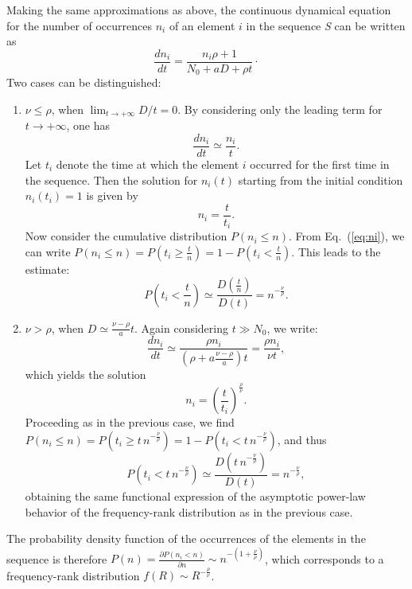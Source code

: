 \documentclass[graybox]{svmult}
\begin{document}
Making the same approximations as above, the continuous dynamical equation for the number of occurrences $n_i$ of an element $i$ in the sequence {\em S} can be written as
%
\begin{equation}
	\frac{d n_i}{d t} = \frac{n_i \rho  +1}{N_0+aD+\rho t}\cdot
\label{eq:dni_dt}
\end{equation}
%
Two cases can be distinguished: 
%
\begin{enumerate}
%
\item $\nu\leq \rho$, when  
\( \displaystyle \lim_{t  \rightarrow +\infty} D/t =  0\). 
By considering only the leading term for \mbox{$t \rightarrow +\infty$}, one has
%
\begin{equation}
	\frac{d n_i}{d t} \simeq \frac{n_i}{t}.
\end{equation}
%
Let $t_i$ denote the time at which the element $i$ occurred for the first time in the sequence. Then the solution for $n_i(t)$ starting from the initial condition  $n_i(t_i)=1$ is given by
%
\begin{equation}
	n_i =\frac{t}{t_i}. \label{eq:ni}
\end{equation}
%
Now consider the cumulative distribution $P(n_i\leq n)$. From Eq.~(\ref{eq:ni}), we can write $P(n_i\leq n)=P(t_i \geq \frac{t}{n})= 1 -P(t_i <\frac{t}{n})$. This leads to the estimate: 
%
\begin{equation}
P(t_i<\frac{t}{n})\simeq\frac{D(\frac{t}{n})}{D(t)}= n^{-\frac{\nu}{\rho}}. \label{eq:cumul1}
\end{equation}

\item $\nu>\rho$, when  $D \simeq \frac{\nu-\rho}{a} t$. Again considering $t \gg N_0$, we write:
%
\begin{equation}
\frac{d n_i}{d t} \simeq \frac{\rho n_i}{(\rho+a \frac{\nu-\rho}{a})t} = \frac{\rho n_i}{\nu
  t},
\end{equation}
%
which yields the solution
%
\begin{equation}
n_i = \left(\frac{t}{t_i} \right)^{\frac{\rho}{\nu}} .
\end{equation}
%
Proceeding as in the previous case, we find 
\( 
	P(n_i\leq n)=P(t_i \geq	 {t}\,{n^{-\frac{\nu}{\rho}}})=1 -P(t_i< {t}\,{n^{-\frac{\nu}{\rho}}})
\), 
and thus 
\begin{equation}
	P(t_i< {t}\,{n^{-\frac{\nu}{\rho}}})\simeq \frac{D({t}\,{n^{-\frac{\nu}{\rho}}})}{D(t)}= n^{-\frac{\nu}{\rho}},\label{eq:cumul2}
\end{equation}
%
obtaining the same functional expression of the asymptotic power-law behavior of the frequency-rank distribution as in the previous case.
%
\end{enumerate}
The probability density function of the occurrences of the elements in the sequence is therefore
\(
	P(n)= \frac{\partial P(n_i<n) }{\partial n}
	\sim n^{-\left(1+\frac{\nu}{\rho}\right)}
\), 
which corresponds to a frequency-rank distribution $f(R) \sim R^{-\frac{\rho}{\nu}} $.
\end{document}
